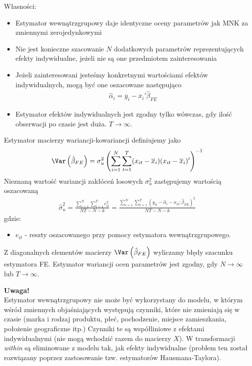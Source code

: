Własności:
\begin{itemize}
\item Estymator wewnątrzgrupowy daje identyczne oceny parametrów jak MNK za zmiennymi zerojedynkowymi
\item Nie jest konieczne szacowanie $ N $ dodatkowych parametrów reprezentujących efekty indywidualne, jeżeli nie są one przedmiotem zainteresowania
\item Jeżeli zainteresowani jesteśmy konkretnymi wartościami efektów indywidualnych, mogą być one oszacowane następująco
\begin{gather*}
\hat \alpha_i=\overline y_i-\overline x_i'\hat \beta _{FE}
\end{gather*}
\item Estymator efektów indywidualnych jest zgodny tylko wówczas, gdy ilość obserwacji po czasie jest duża. $ T\rightarrow \infty  $.
\end{itemize}
Estymator macierzy wariancji-kowariancji definiujemy jako
\begin{gather*}
\Var\left(\hat \beta _{FE}\right)=\sigma _u^2\left(\sum_{i=1}^{N}\sum_{t=1}^{T}(x_{it}-\overline x_{i})(x_{it}-\overline x_{i})'\right)^{-1}
\end{gather*}
Nieznaną wartość wariancji zakłóceń losowych $ \sigma _u^2 $ zastępujemy wartością oszacowaną
\begin{gather*}
\hat \sigma _u^2=
\frac{\sum\limits_{i=1}^{N}\sum\limits_{t=1}^{T}e_{it}^2}{NT-N-k}=
\frac{\sum\limits_{i=1}^{N}\sum\limits_{t=1}^{T}\left(y_{it}-\hat \alpha_i-x_{it};\hat \beta_{FE}\right)^2}{NT-N-k}
\end{gather*}
gdzie:
\begin{itemize}
\item $ e_{it} $ - reszty oszacowanego przy pomocy estymatora wewnątrzgrupowego.
\end{itemize}
Z diagonalnych elementów macierzy $ \Var\left(\hat \beta_{FE} \right) $ wyliczamy błędy szacunku estymatora FE. Estymator wariancji ocen parametrów jest zgodny, gdy $ N\to \infty  $ lub $ T\to \infty  $.

\textbf{Uwaga!}\\
Estymator wewnątrzgrupowy nie może być wykorzystany do modelu, w którym wśród zmiennych objaśniających występują czynniki, które nie zmieniają się w czasie (marka i rodzaj produktu, płeć, pochodzenie, miejsce zamieszkania, położenie geograficzne itp.) Czynniki te są współliniowe z efektami indywidualnymi (nie mogą wchodzić razem do macierzy $ X $). W transformacji \emph{within} są eliminowane z modelu tak, jak efekty indywidualne (problem ten został rozwiązany poprzez zastosowanie tzw. estymatorów Hausmana-Taylora).

